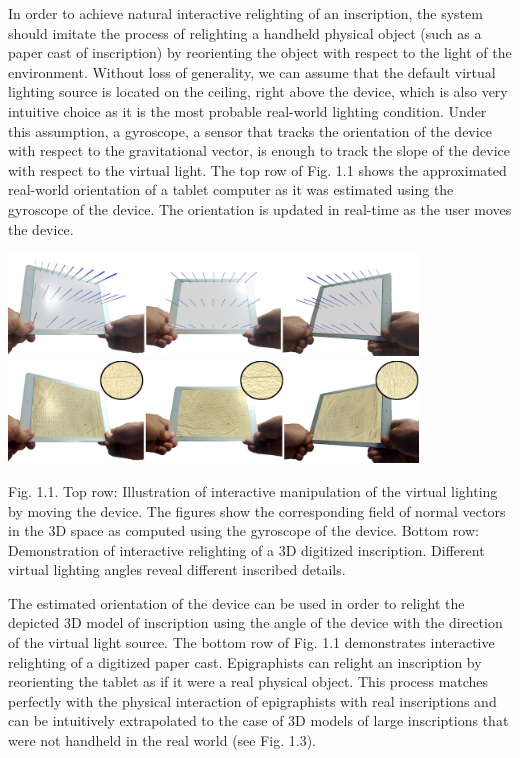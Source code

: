 \documentclass[amsthm,ebook]{saparticle}
\begin{document}
In order to achieve natural interactive relighting of an inscription, the system should imitate the process of
relighting a handheld physical object (such as a paper cast of inscription) by reorienting the object with respect to
the light of the environment. Without loss of generality, we can assume that the default virtual lighting source is
located on the ceiling, right above the device, which is also very intuitive choice as it is the most probable
real-world lighting condition. Under this assumption, a gyroscope, a sensor that tracks the orientation of the device
with respect to the gravitational vector, is enough to track the slope of the device with respect to the virtual light.
The top row of Fig. 1.1 shows the approximated real-world orientation of a tablet computer as it was estimated using
the gyroscope of the device. The orientation is updated in real-time as the user moves the device.

 \includegraphics[width=10.881cm,height=2.72cm]{EAGLE2016cameraready-img001.png} 
\includegraphics[width=10.881cm,height=2.72cm]{EAGLE2016cameraready-img002.png} 

Fig. 1.1. Top row: Illustration of interactive manipulation of the virtual lighting by moving the device. The figures
show the corresponding field of normal vectors in the 3D space as computed using the gyroscope of the device. Bottom
row: Demonstration of interactive relighting of a 3D digitized inscription. Different virtual lighting angles reveal
different inscribed details. \ \ \ 

The estimated orientation of the device can be used in order to relight the depicted 3D model of inscription using the
angle of the device with the direction of the virtual light source. The bottom row of Fig. 1.1 demonstrates interactive
relighting of a digitized paper cast. Epigraphists can relight an inscription by reorienting the tablet as if it were a
real physical object. This process matches perfectly with the physical interaction of epigraphists with real
inscriptions and can be intuitively extrapolated to the case of 3D models of large inscriptions that were not handheld
in the real world (see Fig. 1.3).
\end{document}
